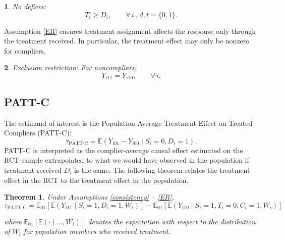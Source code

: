 \documentclass[hidelinks,12pt]{article}
\makeatletter
\newtheorem{theorem}{Theorem}
\newtheorem*{assumption*}{\assumptionnumber}
\providecommand{\assumptionnumber}{}
\newenvironment{assumption}[2]
 {%
  \renewcommand{\assumptionnumber}{Assumption #1}%
  \begin{assumption*}%
  \protected@edef\@currentlabel{#1}%
 }
 {%
  \end{assumption*}
 }
\newcommand{\ex}{\mathbb{E}} %
\makeatother
\begin{document}
\vskip 0.2in
\begin{assumption}{6}{}\label{monotonicity}
No defiers: 
\begin{equation*}
T_i \geq D_i, \qquad \forall \, i \, , \, d, t=\{0,1\}.
\end{equation*}
\end{assumption}
\noindent
Assumption \eqref{ER} ensures treatment assignment affects the response only through the treatment received. In particular, the treatment effect may only be nonzero for compliers.

\begin{assumption}{7}{}\label{ER}
Exclusion restriction: For noncompliers,
\begin{equation*}
Y_{i11} = Y_{i10}, \qquad \forall \, i.
\end{equation*}  
\end{assumption}

\subsection{PATT-C}

The estimand of interest is the Population Average Treatment Effect on Treated Compliers (PATT-C):
%
\begin{equation}\label{tpattc}
\tau_{\text{PATT-C}} = \ex\left( Y_{i01} - Y_{i00} \mid S_i=0, D_i=1\right).
\end{equation}
%
PATT-C is interpreted as the complier-average causal effect estimated on the RCT sample extrapolated to what we would have observed in the population if treatment received $D_i$ is the same. The following theorem relates the treatment effect in the RCT to the treatment effect in the population. 

\vskip 0.2in
\begin{theorem}\label{thm1}
Under Assumptions \eqref{consistency} -- \eqref{ER},
\begin{equation}\label{tpattc-est}
\tau_{\text{PATT-C}} = \ex_{01}\left[  \ex\left(Y_{i11} \mid S_i=1, D_i=1, W_i\right)\right]
-\ex_{01}\left[  \ex\left(Y_{i10} \mid S_i=1, T_i =0, C_i =1, W_i\right) \right] 
\end{equation}

where $\ex_{01}\left[\ex(\cdot \mid\dots, W_i)\right]$ denotes the expectation with respect to the distribution of $W_i$ for population members who received treatment.
\end{theorem}
\end{document}
